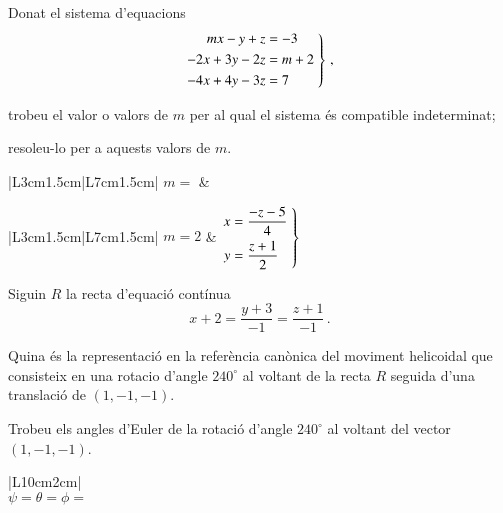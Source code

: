 \documentclass[10pt,catalan]{article}
\begin{document}
\begin{enunciat}
Donat el sistema d'equacions
\[
  \left.\aligned m x - y + z &= -3 \\ - 2 x + 3 y - 2 z &= m + 2 \\ - 4 x + 4 y - 3 z &= 7 \endaligned\;\right\}\,,
\]
\begin{apartats}
\item trobeu el valor o valors de $m$ per al qual el sistema és compatible indeterminat;
\item resoleu-lo per a aquests valors de $m$.
\end{apartats}
\end{enunciat}

\begin{quadricula}
\begin{tabular}{|L{3cm}{1.5cm}|L{7cm}{1.5cm}|}
\hline
$m=$ & \\
\hline
\end{tabular}
\end{quadricula}

\begin{solucio}
\begin{center}
\begin{tabular}{|L{3cm}{1.5cm}|L{7cm}{1.5cm}|}
\hline
$m=2$ & $\left.\aligned x &= \frac{- z -5}{4} \\ y &= \frac{z + 1}{2} \endaligned\;\right\}$\\
\hline
\end{tabular}
\end{center}
\end{solucio}





\begin{enunciat}
Siguin $R$ la recta d'equació contínua
\[
  x + 2 = \frac{y + 3}{-1} = \frac{z + 1}{-1}\,.
\]
\begin{apartats}
\item Quina és la representació en la referència canònica del moviment helicoidal que consisteix en una rotacio d'angle $240^\circ$ al voltant de la recta $R$ seguida d'una translació de $(1,-1,-1)$.
\item Trobeu els angles d'Euler de la rotació d'angle $240^\circ$ al voltant del vector $(1,-1,-1)$.
\end{apartats}
\end{enunciat}

\begin{quadricula}
\begin{tabular}{|L{10cm}{2cm}|}
\hline
  \\
\hline
{}
{$\psi=$\hspace{3.5cm}$\theta=$\hspace{3.5cm}$\phi=$\hspace{3.5cm}} \\
\hline
\end{tabular}
\end{quadricula}
\end{document}
